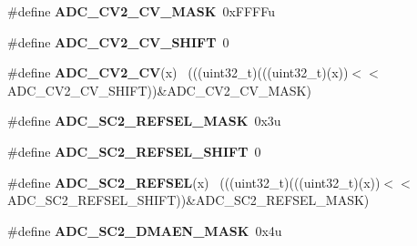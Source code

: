 \begin{DoxyCompactItemize}
\item 
\hypertarget{group___a_d_c___register___masks_gab61d022e3c8d84d77f2895a91c049023}{}\#define {\bfseries A\+D\+C\+\_\+\+C\+V2\+\_\+\+C\+V\+\_\+\+M\+A\+S\+K}~0x\+F\+F\+F\+Fu\label{group___a_d_c___register___masks_gab61d022e3c8d84d77f2895a91c049023}

\item 
\hypertarget{group___a_d_c___register___masks_ga5ecccc775bd06291531df6e989024d38}{}\#define {\bfseries A\+D\+C\+\_\+\+C\+V2\+\_\+\+C\+V\+\_\+\+S\+H\+I\+F\+T}~0\label{group___a_d_c___register___masks_ga5ecccc775bd06291531df6e989024d38}

\item 
\hypertarget{group___a_d_c___register___masks_ga0fb4a2da1223e4604f4007e6b0ad5873}{}\#define {\bfseries A\+D\+C\+\_\+\+C\+V2\+\_\+\+C\+V}(x)                                                    ~(((uint32\+\_\+t)(((uint32\+\_\+t)(x))$<$$<$A\+D\+C\+\_\+\+C\+V2\+\_\+\+C\+V\+\_\+\+S\+H\+I\+F\+T))\&A\+D\+C\+\_\+\+C\+V2\+\_\+\+C\+V\+\_\+\+M\+A\+S\+K)\label{group___a_d_c___register___masks_ga0fb4a2da1223e4604f4007e6b0ad5873}

\item 
\hypertarget{group___a_d_c___register___masks_gaa821d1e2e4575c757e9446da61b2230a}{}\#define {\bfseries A\+D\+C\+\_\+\+S\+C2\+\_\+\+R\+E\+F\+S\+E\+L\+\_\+\+M\+A\+S\+K}~0x3u\label{group___a_d_c___register___masks_gaa821d1e2e4575c757e9446da61b2230a}

\item 
\hypertarget{group___a_d_c___register___masks_gaab9b293eb54de2d9d246766002e44556}{}\#define {\bfseries A\+D\+C\+\_\+\+S\+C2\+\_\+\+R\+E\+F\+S\+E\+L\+\_\+\+S\+H\+I\+F\+T}~0\label{group___a_d_c___register___masks_gaab9b293eb54de2d9d246766002e44556}

\item 
\hypertarget{group___a_d_c___register___masks_gab917ad82f292ba65ae5b3fddb400bd70}{}\#define {\bfseries A\+D\+C\+\_\+\+S\+C2\+\_\+\+R\+E\+F\+S\+E\+L}(x)                                            ~(((uint32\+\_\+t)(((uint32\+\_\+t)(x))$<$$<$A\+D\+C\+\_\+\+S\+C2\+\_\+\+R\+E\+F\+S\+E\+L\+\_\+\+S\+H\+I\+F\+T))\&A\+D\+C\+\_\+\+S\+C2\+\_\+\+R\+E\+F\+S\+E\+L\+\_\+\+M\+A\+S\+K)\label{group___a_d_c___register___masks_gab917ad82f292ba65ae5b3fddb400bd70}

\item 
\hypertarget{group___a_d_c___register___masks_ga50fc5fed4844c3ceb8da9b595029da11}{}\#define {\bfseries A\+D\+C\+\_\+\+S\+C2\+\_\+\+D\+M\+A\+E\+N\+\_\+\+M\+A\+S\+K}~0x4u\label{group___a_d_c___register___masks_ga50fc5fed4844c3ceb8da9b595029da11}


\end{DoxyCompactItemize}

